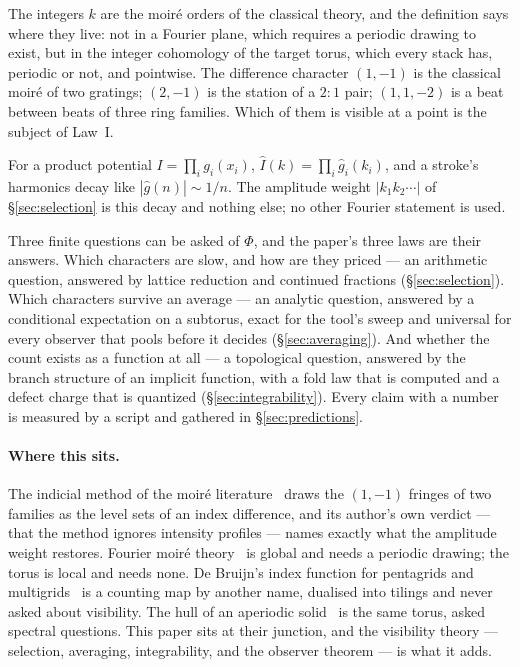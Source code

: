 The integers $k$ are the moir\'e orders of the classical theory, and the
definition says where they live: not in a Fourier plane, which requires a
periodic drawing to exist, but in the integer cohomology of the target torus,
which every stack has, periodic or not, and pointwise. The difference
character $(1,-1)$ is the classical moir\'e of two gratings; $(2,-1)$ is the
station of a $2{:}1$ pair; $(1,1,-2)$ is a beat between beats of three ring
families. Which of them is visible at a point is the subject of Law~I.

\begin{remark}
For a product potential $I=\prod_i g_i(x_i)$, $\hat I(k)=\prod_i\hat g_i(k_i)$,
and a stroke's harmonics decay like $|\hat g(n)|\sim 1/n$. The amplitude weight
$|k_1k_2\cdots|$ of \S\ref{sec:selection} is this decay and nothing else; no
other Fourier statement is used.
\end{remark}

Three finite questions can be asked of $\Phi$, and the paper's three laws are
their answers. Which characters are slow, and how are they priced --- an
arithmetic question, answered by lattice reduction and continued fractions
(\S\ref{sec:selection}). Which characters survive an average --- an analytic
question, answered by a conditional expectation on a subtorus, exact for the
tool's sweep and universal for every observer that pools before it decides
(\S\ref{sec:averaging}). And whether the count exists as a function at all ---
a topological question, answered by the branch structure of an implicit
function, with a fold law that is computed and a defect charge that is
quantized (\S\ref{sec:integrability}). Every claim with a number is measured
by a script and gathered in \S\ref{sec:predictions}.

\paragraph{Where this sits.}
The indicial method of the moir\'e literature~\cite{Amidror2009Theory} draws
the $(1,-1)$ fringes of two families as the level sets of an index difference,
and its author's own verdict --- that the method ignores intensity profiles
--- names exactly what the amplitude weight restores. Fourier moir\'e
theory~\cite{Amidror2009Theory,AmidrorII} is global and needs a periodic
drawing; the torus is local and needs none. De Bruijn's index function for
pentagrids and multigrids~\cite{deBruijn1981Penrose} is a counting map by
another name, dualised into tilings and never asked about visibility. The hull
of an aperiodic solid~\cite{Bellissard2000Hulls} is the same torus, asked
spectral questions. This paper sits at their junction, and the visibility
theory --- selection, averaging, integrability, and the observer theorem ---
is what it adds.


